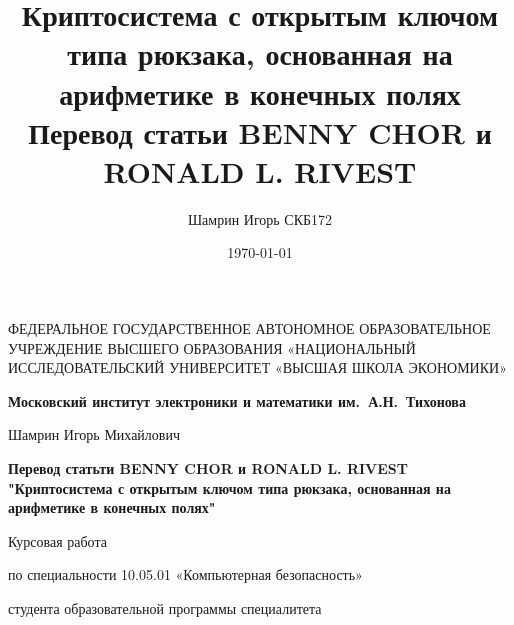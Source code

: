 \documentclass[a4paper,12pt]{article}
\author{Шамрин Игорь СКБ172}
\title{ Криптосистема с открытым ключом типа рюкзака, основанная на арифметике в конечных полях \DL
\large Перевод статьи BENNY CHOR  и RONALD L. RIVEST}
\date{\today}
\begin{document}
 
\thispagestyle{empty}

\begin{center}

\sc
ФЕДЕРАЛЬНОЕ  ГОСУДАРСТВЕННОЕ АВТОНОМНОЕ
ОБРАЗОВАТЕЛЬНОЕ УЧРЕЖДЕНИЕ ВЫСШЕГО ОБРАЗОВАНИЯ
«НАЦИОНАЛЬНЫЙ ИССЛЕДОВАТЕЛЬСКИЙ УНИВЕРСИТЕТ
«ВЫСШАЯ ШКОЛА ЭКОНОМИКИ»
\end{center}

\begin{center}
\bf Московский институт электроники и математики им.~А.Н.~Тихонова
\end{center}

\vspace{1cm}

\begin{center}
Шамрин Игорь Михайлович
\end{center}

\vspace{1cm}

\begin{center}
\bf Перевод статьти BENNY CHOR  и RONALD L. RIVEST "Криптосистема с открытым ключом типа рюкзака, основанная на арифметике в конечных полях"
\end{center}

\vspace{10mm}

\begin{center}
Курсовая работа \par
по специальности 10.05.01 «Компьютерная безопасность» \par
студента образовательной программы специалитета
\end{center}

\vfill
\end{document}
